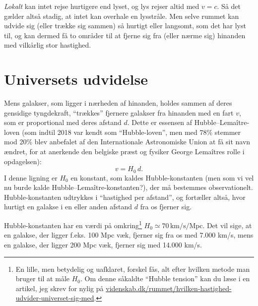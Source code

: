 \documentclass[useAMS,danish]{aa}
\def\vrec{\mbox{$v$}}
\begin{document}
\emph{Lokalt} kan intet rejse hurtigere end lyset, og lys rejser altid med $v=c$.
Så det gælder altså stadig, at intet kan overhale en lysstråle.
Men selve rummet kan udvide sig (eller trække sig sammen) så hurtigt eller langsomt, som det har lyst til, og kan dermed få to områder til at fjerne sig fra (eller nærme sig) hinanden med vilkårlig stor hastighed.

\section{Universets udvidelse}
\label{sec:udvidelse}

Mens galakser, som ligger i nærheden af hinanden, holdes sammen af deres gensidige tyngdekraft, ``trækkes'' fjernere galakser fra hinanden med en fart \vrec, som er proportional med deres afstand $d$.
Dette er essensen af Hubble--Lemaître-loven (som indtil 2018 var kendt som ``Hubble-loven'', men med 78\% stemmer mod 20\% blev anbefalet af den Internationale Astronomiske Union at få sit navn ændret, for at anerkende den belgiske præst og fysiker George Lemaîtres rolle i opdagelsen):
\begin{equation}
    \label{eq:hubble}
    \vrec = H_0 \, d.
\end{equation}
I denne ligning er $H_0$ en konstant, som kaldes Hubble-konstanten (men som vi vel nu burde kalde Hubble--Lemaître-konstanten?), der må bestemmes observationelt.
Hubble-konstanten udtrykkes i ``hastighed per afstand'', og fortæller altså, hvor hurtigt en galakse i en eller anden afstand $d$ fra os fjerner sig.
%
\begin{figure}
    \caption*{{\sf {}}}
\end{figure}
%
Hubble-konstanten har en værdi på omkring\footnote{En lille, men betydelig og uafklaret, forskel fås, alt efter hvilken metode man bruger til at måle $H_0$. Om denne såkaldte ``Hubble tension'' kan du læse i en artikel, jeg skrev for nylig på \href{https://videnskab.dk/rummet/hvilken-hastighed-udvider-universet-sig-med}{videnskab.dk/rummet/hvilken-hastighed-udvider-universet-sig-med}.} 
$H_0 \simeq 70 \,\mathrm{km}/\mathrm{s}/\mathrm{Mpc}$.
Det vil sige, at en galakse, der ligger f.eks. 100 Mpc væk, fjerner sig fra os med 7.000 km/s, mens en galakse, der ligger 200 Mpc væk, fjerner sig med 14.000 km/s.
\end{document}
